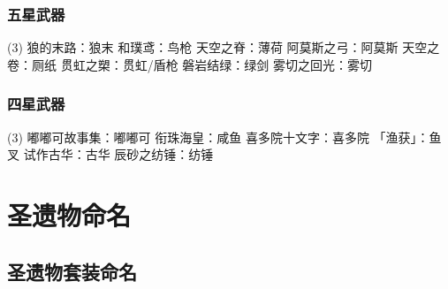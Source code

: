 \subsubsection{五星武器}

\begin{tasks}(3)
	\task 狼的末路：狼末
	\task 和璞鸢：鸟枪
	\task 天空之脊：薄荷
	\task 阿莫斯之弓：阿莫斯
	\task 天空之卷：厕纸
	\task 贯虹之槊：贯虹/盾枪
	\task 磐岩结绿：绿剑
	\task 雾切之回光：雾切
\end{tasks}

\subsubsection{四星武器}

\begin{tasks}(3)
	\task 嘟嘟可故事集：嘟嘟可
	\task 衔珠海皇：咸鱼
	\task 喜多院十文字：喜多院
	\task 「渔获」：鱼叉
	\task 试作古华：古华
	\task 辰砂之纺锤：纺锤
\end{tasks}




\section{圣遗物命名}

\subsection{圣遗物套装命名}

